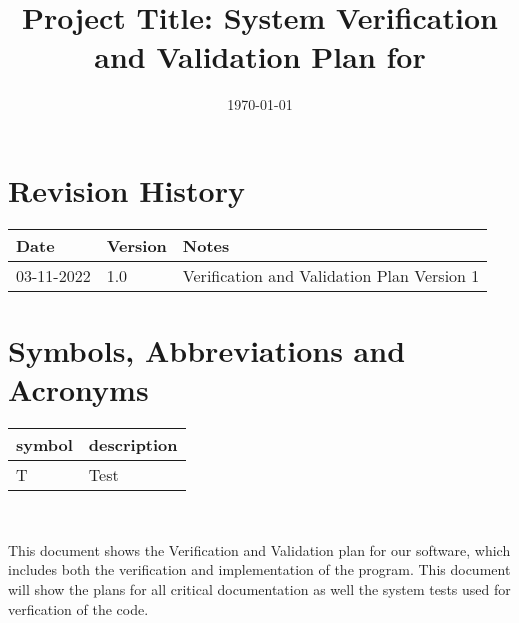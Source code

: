\documentclass[12pt, titlepage]{article}
\begin{document}
\title{Project Title: System Verification and Validation Plan for \progname{}} 
\author{\authname}
\date{\today}
	
\maketitle


\section{Revision History}

\begin{tabularx}{\textwidth}{p{3cm}p{2cm}X}
\toprule {\bf Date} & {\bf Version} & {\bf Notes}\\
\midrule
03-11-2022 & 1.0 & Verification and Validation Plan Version 1\\
\bottomrule
\end{tabularx}

\newpage

\tableofcontents

\listoftables
{}

\listoffigures
{}

\newpage

\section{Symbols, Abbreviations and Acronyms}

\renewcommand{\arraystretch}{1.2}
\begin{tabular}{l l} 
  \toprule		
  \textbf{symbol} & \textbf{description}\\
  \midrule 
  T & Test\\
  \bottomrule
\end{tabular}\\


\newpage


This document shows the Verification and Validation plan for our software, which includes both the verification and implementation of the program. This document will show the plans for all critical documentation as well the system tests used for verfication of the code.
\end{document}
